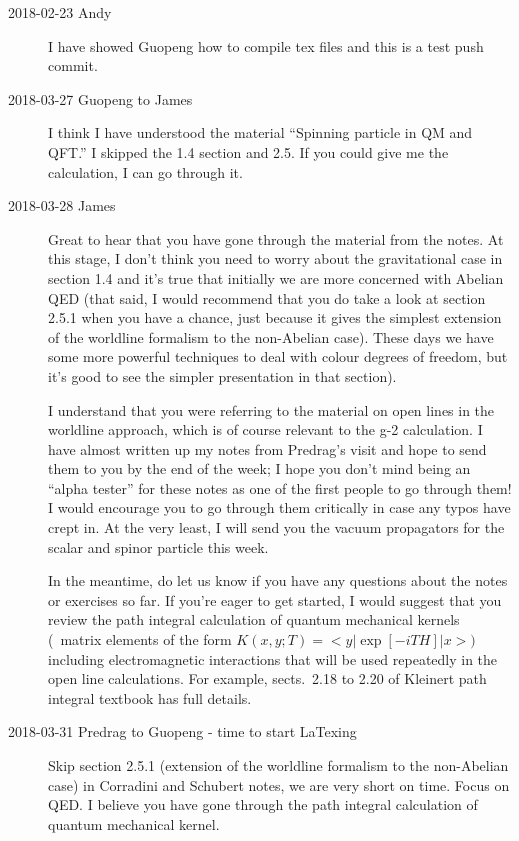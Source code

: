 \begin{description}
\item[2018-02-23 Andy] I have showed Guopeng how to compile tex files and
this is a test push commit.

\item[2018-03-27 Guopeng to James]
I think I have understood the material ``Spinning particle in QM and QFT.'' I
skipped the 1.4 section and 2.5. If you could give me the calculation,  I can
go through it.

\item[2018-03-28 James]
Great to hear that you have gone through the material from the notes. At this
stage, I don't think you need to worry about the gravitational case in section
1.4 and it's true that initially we are more concerned with Abelian QED (that
said, I would recommend that you do take a look at section 2.5.1 when you have
a chance, just because it gives the simplest extension of the worldline
formalism to the non-Abelian case). These days we have some more powerful
techniques to deal with colour degrees of freedom, but it's good to see the
simpler presentation in that section).

I understand that you were referring to the material on open lines in the
worldline approach, which is of course relevant to the g-2 calculation. I have
almost written up my notes from Predrag's visit and hope to send them to you by
the end of the week; I hope you don't mind being an ``alpha tester'' for these
notes as one of the first people to go through them! I would encourage you to
go through them critically in case any typos have crept in. At the very least,
I will send you the vacuum propagators for the scalar and spinor particle this
week.

In the meantime, do let us know if you have any questions about the notes or
exercises so far. If you're eager to get started, I would suggest that you
review the path integral calculation of quantum mechanical kernels (\ie\ matrix
elements of the form $K(x, y; T) = <y | \exp[-i T H] | x>)$ including
electromagnetic interactions that will be used repeatedly in the open line
calculations. For example, sects.~2.18 to 2.20 of Kleinert path
integral textbook has full details.

\item[2018-03-31 Predrag to Guopeng - time to start LaTexing]
Skip section 2.5.1 (extension of the worldline formalism to the non-Abelian
case) in Corradini and Schubert notes, we are very short on time.
Focus on QED. I believe you have gone through the path integral calculation of
quantum mechanical kernel.


\end{description}
